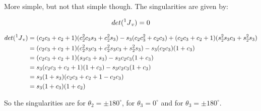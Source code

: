 \documentclass{exam}
\begin{document}
\begin{questions}
\begin{parts}
More simple, but not that simple though. The singularities are given by:

\begin{equation}
  det(\prescript{1}{}J_{v}) = 0
\end{equation}

\begin{equation}
  \begin{split}
    det(\prescript{1}{}J_{v}) & = (c_{2}c_{3}+c_{2}+1)(c_{2}^{2}c_{3}s_{3}+c_{2}^2s_{3}) - s_{3}(c_{2}c_{3}^2+c_{2}c_{3}) + (c_{2}c_{3}+c_{2}+1)(s_{2}^2s_{3}c_{3}+s_{2}^2s_{3}) \\
    & = (c_{2}c_{3}+c_{2}+1)(c_{2}^2s_{3}c_{3}+c_{2}^2s_{3}c_{3}+s_{2}^2s_{3}) - s_{3}(c_{2}c_{3})(1+c_{3}) \\
    & = (c_{2}c_{3}+c_{2}+1)(s_{3}c_{3}+s_{3}) - s_{3}c_{2}c_{3}(1+c_{3}) \\
    & = s_{3}(c_{2}c_{3}+c_{2}+1)(1+c_{3}) - s_{3}c_{2}c_{3}(1+c_{3}) \\
    & = s_{3}(1+s_{3})(c_{2}c_{3}+c_{2}+1-c_{2}c_{3}) \\
    & = s_{3}(1+c_{3})(1+c_{2}) \\
  \end{split}
\end{equation}

So the singularities are for $\theta_{2}=\pm180^{\circ}$, for $\theta_{3}=0^{\circ}$ and for $\theta_{3}=\pm180^{\circ}$.

\end{parts}

\end{questions}
\end{document}
